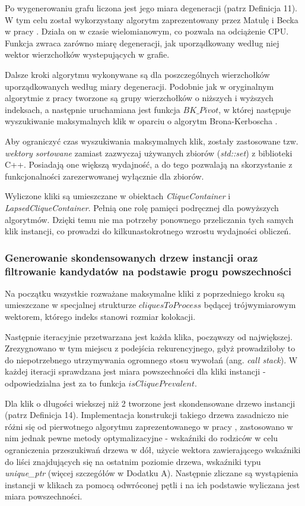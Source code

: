 \documentclass[12pt]{article}
\begin{document}
Po wygenerowaniu grafu liczona jest jego miara degeneracji (patrz Definicja 11). W tym celu został wykorzystany algorytm zaprezentowany przez Matulę i Becka w pracy \cite{matusiak}. Działa on w czasie wielomianowym, co pozwala na odciążenie CPU. Funkcja zwraca zarówno miarę degeneracji, jak uporządkowany według niej wektor wierzchołków wystepujących w grafie.

Dalsze kroki algorytmu wykonywane są dla poszczególnych wierzchołków uporządkowanych według miary degeneracji. Podobnie jak w oryginalnym algorytmie z pracy \cite{pivot} tworzone są grupy wierzchołków o niższych i wyższych indeksach, a następnie uruchamiana jest funkcja $ BK\_Pivot $, w której następuje wyszukiwanie maksymalnych klik w oparciu o algorytm Brona-Kerboscha \cite{kerbosz}. 

Aby ograniczyć czas wyszukiwania maksymalnych klik, zostały zastosowane tzw. \textit{wektory sortowane} zamiast zazwyczaj używanych zbiorów (\textit{std::set}) z biblioteki C++. Posiadają one większą wydajność, a do tego pozwalają na skorzystanie z funkcjonalności zarezerwowanej wyłącznie dla zbiorów.

Wyliczone kliki są umieszczane w obiektach \textit{CliqueContainer} i \textit{LapsedCliqueContainer}. Pełnią one rolę pamięci podręcznej dla powyższych algorytmów. Dzięki temu nie ma potrzeby ponownego przeliczania tych samych klik instancji, co prowadzi do kilkunastokrotnego wzrostu wydajności obliczeń.

\subsubsection{Generowanie skondensowanych drzew instancji oraz filtrowanie kandydatów na podstawie progu powszechności}

Na początku wszystkie rozważane maksymalne kliki z poprzedniego kroku są umieszczane w specjalnej strukturze $ cliquesToProcess $ będącej trójwymiarowym wektorem, którego indeks stanowi rozmiar kolokacji. 

Następnie iteracyjnie przetwarzana jest każda klika, począwszy od największej. Zrezygnowano w tym miejscu z podejścia rekurencyjnego, gdyż prowadziłoby to do niepotrzebnego utrzymywania ogromnego stosu wywołań (ang. \textit{call stack}). W każdej iteracji sprawdzana jest miara powszechności dla kliki instancji - odpowiedzialna jest za to funkcja $ isCliquePrevalent $. 

Dla klik o długości wiekszej niż 2 tworzone jest skondensowane drzewo instancji (patrz Definicja 14). Implementacja konstrukcji takiego drzewa zasadniczo nie różni się od pierwotnego algorytmu zaprezentowanego w pracy \cite{chinczyki}, zastosowano w nim jednak pewne metody optymalizacyjne - wskaźniki do rodziców w celu ograniczenia przeszukiwań drzewa w dół, użycie wektora zawierającego wskaźniki do liści znajdujących się na ostatnim poziomie drzewa, wskaźniki typu \textit{unique\_ptr} (więcej szczegółów w Dodatku A). Następnie zliczane są wystąpienia instancji w klikach za pomocą odwróconej pętli i na ich podstawie wyliczana jest miara powszechności.
\end{document}
